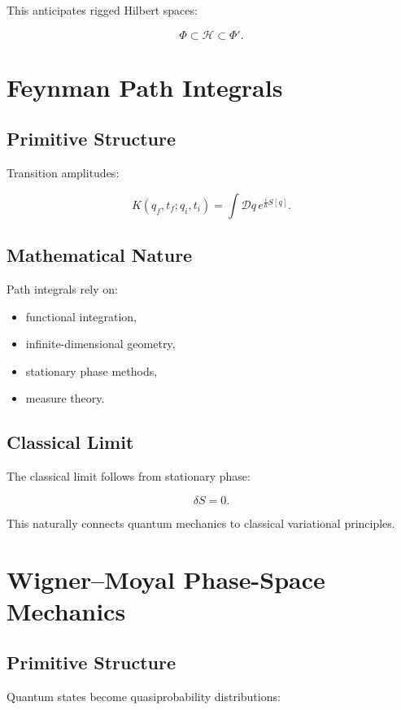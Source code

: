\documentclass[11pt]{article}
\begin{document}
This anticipates rigged Hilbert spaces:

\[
\Phi \subset \mathcal H \subset \Phi'.
\]

\section{Feynman Path Integrals}

\subsection{Primitive Structure}

Transition amplitudes:

\[
K(q_f,t_f;q_i,t_i)
=
\int \mathcal Dq \,
e^{\frac{i}{\hbar}S[q]}.
\]

\subsection{Mathematical Nature}

Path integrals rely on:

\begin{itemize}
\item functional integration,
\item infinite-dimensional geometry,
\item stationary phase methods,
\item measure theory.
\end{itemize}

\subsection{Classical Limit}

The classical limit follows from stationary phase:

\[
\delta S = 0.
\]

This naturally connects quantum mechanics to classical variational principles.

\section{Wigner--Moyal Phase-Space Mechanics}

\subsection{Primitive Structure}

Quantum states become quasiprobability distributions:
\end{document}
